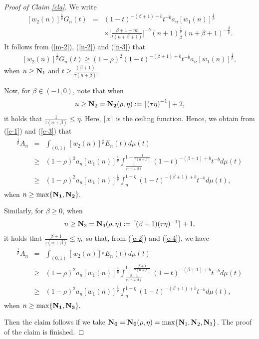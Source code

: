 \documentclass[10pt]{amsart}
\theoremstyle{definition}
\theoremstyle{question}
\numberwithin{equation}{section}
\begin{document}
\begin{proof}[Proof of Claim \ref{cla}]
We write
\begin{eqnarray}\label{n-3}
[w_2(n)]^{\frac{1}{p}}G_n(t)&=&(1-t)^{-(\beta+1)+b}t^{-b}a_n[w_1(n)]^{\frac{1}{p}}\nonumber \\
&& \times \Big[\frac{\beta+1+nt}{t(n+\beta+1)}\Big]^{-b} (n+1)_{\beta}^{\frac{1}{p}}(n+\beta+1)^{-\frac{\beta}{p}}.
\end{eqnarray}
It follows from (\ref{m-2}), (\ref{n-2}) and (\ref{n-3}) that  
\begin{eqnarray}\label{e-4}
[w_2(n)]^{\frac{1}{p}}G_n(t)\geq (1-\rho)^2(1-t)^{-(\beta+1)+b}t^{-b}a_n[w_1(n)]^{\frac{1}{p}},
\end{eqnarray}
when $n\geq {\bf{N}}_1$ and $t\geq \frac{(\beta+1)}{\tau(n+\beta)}$.

Now, for $\beta\in (-1,0)$, note that when
$$n\geq {\bf{N}}_2={\bf{N}_2}(\rho, \eta):=\lceil{(\tau\eta)}^{-1}\rceil+2,$$ 
it holds that $\frac{1}{\tau(n+\beta)}\leq \eta.$ Here, $\lceil x \rceil$ is the ceiling function.
Hence, we obtain from (\ref{e-1}) and (\ref{e-3}) that
\begin{eqnarray}
[w_2(n)]^{\frac{1}{p}}A_n&=&\int_{(0,1)}[w_2(n)]^{\frac{1}{p}}E_n(t)d\mu(t) \nonumber \\
&\geq& (1-\rho)^2a_n[w_1(n)]^{\frac{1}{p}} \int_{\frac{1}{\tau(n+\beta)}}^{1-\frac{1}{\tau(n+\beta)}}(1-t)^{-(\beta+1)+b}t^{-b}d\mu(t) \nonumber \\
&\geq & (1-\rho)^2 a_n[w_1(n)]^{\frac{1}{p}} \int_{\eta}^{1-\eta}(1-t)^{-(\beta+1)+b}t^{-b}d\mu(t),\nonumber
\end{eqnarray}
when $n\geq\max\{\bf{N}_1, \bf{N}_2\}.$ 

Similarly, for $\beta\geq 0$, when 
$$n\geq {\bf{N}}_3={\bf{N}}_3({\rho, \eta}):=\lceil(\beta+1)(\tau\eta)^{-1}\rceil+1,$$ it holds that
$\frac{\beta+1}{\tau(n+\beta)}\leq\eta,$ so that, from (\ref{e-2}) and (\ref{e-4}), we have 
\begin{eqnarray}
[w_2(n)]^{\frac{1}{p}}A_n&=&\int_{(0,1)}[w_2(n)]^{\frac{1}{p}}E_n(t)d\mu(t) \nonumber \\
&\geq& (1-\rho)^2 a_n[w_1(n)]^{\frac{1}{p}} \int_{\frac{\beta+1}{\tau(n+\beta)}}^{1-\frac{\beta+1}{\tau(n+\beta)}}(1-t)^{-(\beta+1)+b}t^{-b}d\mu(t) \nonumber \\
&\geq & (1-\rho)^2 a_n[w_1(n)]^{\frac{1}{p}} \int_{\eta}^{1-\eta}(1-t)^{-(\beta+1)+b}t^{-b}d\mu(t), \nonumber
\end{eqnarray}
when $n\geq \max\{\bf{N}_1, \bf{N}_3\}.$ 

Then the claim follows if we take ${\bf{N}_0}={\bf{N}_0}({\rho, \eta})=\max\{\mathbf{N}_1, {\mathbf{N}}_2, {\mathbf{N}}_3\}$. The proof of the claim is finished. 
\end{proof}
\end{document}
